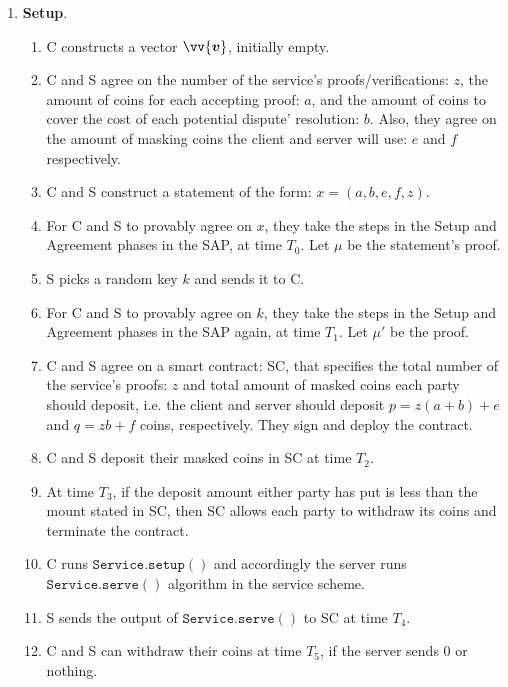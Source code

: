 \begin{enumerate}
\item \textbf{Setup}. 
\begin{enumerate}
\item C constructs a vector $\vv{\bm{v}}$, initially empty. 
\item C and S agree on the number of the service's proofs/verifications: $z$, the amount of coins for each accepting proof: $a$, and the amount of coins  to cover the cost of each potential dispute' resolution: $b$. Also, they agree on the amount of masking coins the client and server will use: $e$ and $f$ respectively. 

\item C and S construct  a statement of the  form: $x=(a,b,e,f,z)$.   
\item For C and S to provably agree on $x$, they take the steps in the Setup and Agreement phases in the SAP, at time $T_0$. Let $\mu$ be the statement's proof. 

\item S picks a random key $k$ and sends it to C.
\item For C and S to provably agree on $k$, they take the steps in the Setup and Agreement phases in the SAP again, at time $T_1$. Let $\mu'$ be the proof. 


\item C and S agree on a smart contract: SC, that specifies the total number of the service's proofs: $z$ and total amount of masked coins each party should deposit, i.e. the client and server should deposit $p=z(a+b)+e$ and $q=zb+f$ coins, respectively. They sign and deploy the contract. 

\item C and S deposit their masked coins in SC at time $T_2$.
\item At time $T_3$, if the deposit amount either party has put is less than the mount stated in SC, then SC allows each party to withdraw its
coins and terminate the contract.

\item C runs $\mathtt{Service.setup()}$ and accordingly the server runs $\mathtt{Service.serve()}$ algorithm in the service scheme. 

\item S sends the output of $\mathtt{Service.serve()}$  to SC at time $T_{4}$.
\item C and S can withdraw their coins at time $T_{5}$, if the server sends 0 or nothing. 


\end{enumerate}
\end{enumerate}
